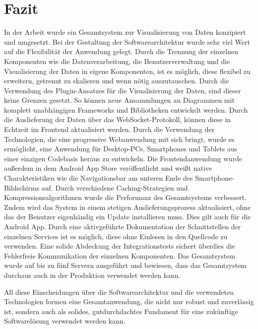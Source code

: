 \chapter{Fazit}
\label{chap:fazit}

In der Arbeit wurde ein Gesamtsystem zur Visualisierung von Daten konzipiert und
umgesetzt. Bei der Gestaltung der Softwarearchitektur wurde sehr viel Wert auf
die Flexibilität der Anwendung gelegt. Durch die Trennung der einzelnen Komponenten
wie die Datenverarbeitung, die Benutzerverwaltung und die Visualisierung der Daten
in eigene Komponenten, ist es möglich, diese flexibel zu erweitern,
getrennt zu skalieren und wenn nötig auszutauschen. Durch die Verwendung des
Plugin-Ansatzes für die Visualisierung der Daten, sind dieser keine Grenzen gesetzt.
So können neue Ansammlungen an Diagrammen mit komplett unabhängigen Frameworks und
Bibliotheken entwickelt werden. Durch die Auslieferung der Daten über
das WebSocket-Protokoll, können diese in Echtzeit im Frontend aktualisiert werden.
Durch die Verwendung der Technologien, die eine progressive Webanwendung mit sich bringt,
wurde es ermöglicht, eine Anwendung für Desktop-PCs, Smartphones und Tablets aus einer einzigen
Codebasis heraus zu entwickeln. Die Frontendanwendung wurde außerdem in dem Android App Store
veröffentlicht und weißt native Charakteristiken wie die Navigationsbar am unteren
Ende des Smartphone-Bildschirms auf. Durch verschiedene Caching-Strategien und Kompressionsalgorithmen
wurde die Performanz des Gesamtsystems verbessert. Zudem wird das System in einem 
stetigen Auslieferungsprozess aktualisiert, ohne das der Benutzer eigenhändig ein Update
installieren muss. Dies gilt auch für die Android App. Durch eine aktivgeführte Dokumentation
der Schnittstellen der einzelnen Services ist es möglich, diese ohne Einlesen in den Quellcode
zu verwenden. Eine solide Abdeckung der Integrationstests sichert überdies die
Fehlerfreie Kommunikation der einzelnen Komponenten. Das Gesamtsystem wurde auf bis zu
fünf Servern ausgeführt und bewiesen, dass das Gesamtsystem durchaus auch in der Produktion
verwendet werden kann.

All diese Einscheidungen über die Softwarearchitektur und die verwendeten Technologien
formen eine Gesamtanwendung, die nicht nur robust und zuverlässig ist, sondern auch
als solides, gutdurchdachtes Fundament für eine zukünftige Softwarelösung
verwendet werden kann.
